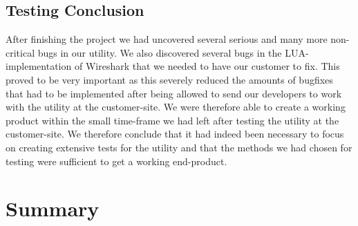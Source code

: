 \subsection{Testing Conclusion}
After finishing the project we had uncovered several serious and many more non-critical bugs in our utility. We also discovered several bugs in the LUA-implementation of Wireshark that we needed to have our customer to fix. This proved to be very important as this severely reduced the amounts of bugfixes that had to be implemented after being allowed to send our developers to work with the utility at the customer-site. We were therefore able to create a working product within the small time-frame we had left after testing the utility at the customer-site. We therefore conclude that it had indeed been necessary to focus on creating extensive tests for the utility and that the methods we had chosen for testing were sufficient to get a working end-product.


\section{Summary}

